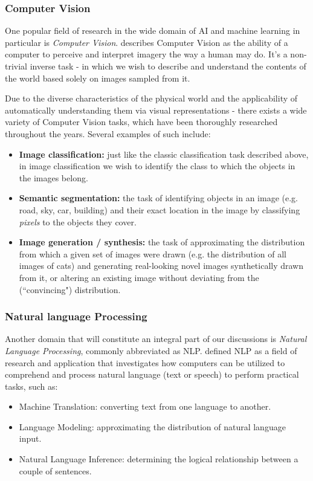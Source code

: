 \documentclass{article}
\begin{document}
\subsubsection{Computer Vision}
\label{subsec:cv}

One popular field of research in the wide domain of AI and machine learning in particular is \emph{Computer Vision}. \citet{szeliski2022computer} describes Computer Vision as the ability of a computer to perceive and interpret imagery the way a human may do. It's a non-trivial inverse task - in which we wish to describe and understand the contents of the world based solely on images sampled from it.

\medskip
\noindent
Due to the diverse characteristics of the physical world and the applicability of automatically understanding them via visual representations - there exists a wide variety of Computer Vision tasks, which have been thoroughly researched throughout the years. Several examples of such include:
\begin{itemize}
    \item \textbf{Image classification:}
        just like the classic classification task described above, in image classification we wish to identify the class to which the objects in the images belong.
    \item \textbf{Semantic segmentation:}
        the task of identifying objects in an image (e.g. road, sky, car, building) and their exact location in the image by classifying \emph{pixels} to the objects they cover.
    \item \textbf{Image generation / synthesis:}
        the task of approximating the distribution from which a given set of images were drawn (e.g. the distribution of all images of cats) and generating real-looking novel images synthetically drawn from it, or altering an existing image without deviating from the (``convincing") distribution.
        
\end{itemize}

\subsubsection{Natural language Processing}
\label{subsec:nlp}

Another domain that will constitute an integral part of our discussions is \emph{Natural Language Processing}, commonly abbreviated as NLP. \citet{chowdhary2020natural} defined NLP as a field of research and application that investigates how computers can be utilized to comprehend and process natural language (text or speech) to perform practical tasks, such as:
\begin{itemize}
    \item {Machine Translation}:
        converting text from one language to another.
    \item {Language Modeling}:
        approximating the distribution of natural language input.
    \item{Natural Language Inference}:
        determining the logical relationship between a couple of sentences.
\end{itemize}
\end{document}
